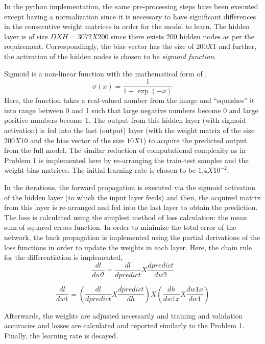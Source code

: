 \documentclass[11pt]{scrartcl}
\begin{document}
{\begin{enumerate}[label=(\alph*)]
In the python implementation, the same pre-processing steps have been executed except having a normalization since it is necessary to have significant differences in the consecutive weight matrices in order for the model to learn. The hidden layer is of size $DXH = 3072X200$ since there exists 200 hidden nodes as per the requirement. Correspondingly, the bias vector has the size of $200X1$ and further, the activation of the hidden nodes is chosen to be \textit{sigmoid function}. 

Sigmoid is a non-linear function with the mathematical form of \cite{web1},
\begin{equation}
    \sigma (x) = \frac{1}{1+\exp{(-x)}}
\end{equation}
Here, the function takes a real-valued number from the image and “squashes” it into range between 0 and 1 such that large negative numbers become 0 and large positive numbers become 1. The output from this hidden layer (with sigmoid activation) is fed into the last (output) layer (with the weight matrix of the size $200X10$ and the bias vector of the size $10X1$) to acquire the predicted output from the full model. The similar reduction of computational complexity as in Problem 1 is implemented here by re-arranging the train-test samples and the weight-bias matrices. The initial learning rate is chosen to be $1.4X10^{-2}$. 

In the iterations, the forward propagation is executed via the sigmoid activation of the hidden layer (to which the input layer feeds) and then, the acquired matrix from this layer is re-arranged and fed into the last layer to obtain the prediction. The loss is calculated using the simplest method of loss calculation: the mean sum of squared errors function. In order to minimize the total error of the network, the back propagation is implemented using the partial derivations of the loss functions in order to update the weights in each layer. Here, the chain rule for the differentiation is implemented,
\begin{equation}
    \frac{dl}{dw2} = \frac{dl}{dpredict} X \frac{dpredict}{dw2}
\end{equation}

\begin{equation}
    \frac{dl}{dw1} = (\frac{dl}{dpredict}X\frac{dpredict}{dh})X(\frac{dh}{dw1x}X\frac{dw1x}{dw1})
\end{equation}

Afterwards, the weights are adjusted necessarily and training and validation accuracies and losses are calculated and reported similarly to the Problem 1. Finally, the learning rate is decayed.


\end{enumerate}}
\end{document}
